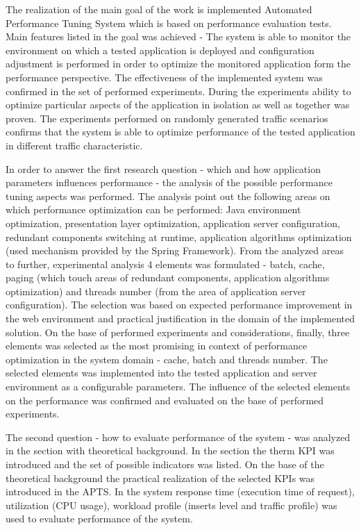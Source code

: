 \documentclass[12pt,a4paper]{article}
\begin{document}
The realization of the main goal of the work is implemented Automated Performance Tuning System which is based on performance evaluation tests. Main features listed in the goal was achieved - The system is able to monitor the environment on which a tested application is deployed and configuration adjustment is performed in order to optimize the monitored application form the performance perspective. The effectiveness of the implemented system was confirmed in the set of performed experiments. During the experiments ability to optimize particular aspects of the application in isolation as well as together was proven. The experiments performed on randomly generated traffic scenarios confirms that the system is able to optimize performance of the tested application in different traffic characteristic.

In order to answer the first research question - which and how application parameters influences performance - the analysis of the possible performance tuning aspects was performed. The analysis point out the following areas on which performance optimization can be performed: Java environment optimization, presentation layer optimization, application server configuration, redundant components switching at runtime, application algorithms  optimization (used mechanism provided by the Spring Framework). From the analyzed areas to further, experimental analysis 4 elements was formulated - batch, cache, paging (which touch areas of redundant components, application algorithms optimization) and threads number (from the area of application server configuration). The selection was based on expected performance improvement in the web environment and practical justification in the domain of the implemented solution. On the base of performed experiments and considerations, finally, three elements was selected as the most promising in context of performance optimization in the system domain - cache, batch and threads number. The selected elements was implemented into the tested application and server environment as a configurable parameters. The influence of the selected elements on the performance was confirmed and evaluated on the base of performed experiments. 

The second question - how to evaluate performance of the system - was analyzed in the section with theoretical background. In the section the therm KPI was introduced and the set of possible indicators was listed. On the base of the theoretical background the practical realization of the selected KPIs was introduced in the APTS. In the system response time (execution time of request), utilization (CPU usage), workload profile (inserts level and traffic profile) was used to evaluate performance of the system.
\end{document}
